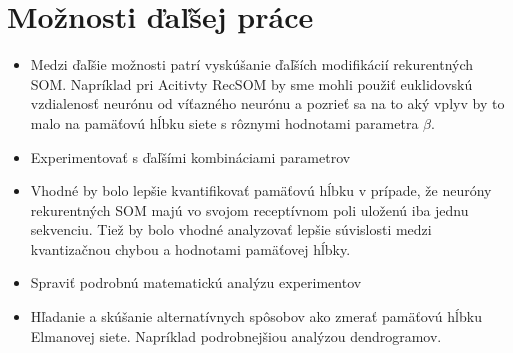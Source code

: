 \section{Možnosti ďaľšej práce}
\begin{itemize}
    \item Medzi ďaľšie možnosti patrí vyskúšanie ďaľších modifikácií rekurentných SOM. Napríklad pri Acitivty RecSOM 
    by sme mohli použiť euklidovskú vzdialenosť neurónu od víťazného neurónu a pozrieť sa na to aký vplyv by to malo 
    na pamäťovú hĺbku siete s rôznymi hodnotami parametra $\beta$.
    \item Experimentovať s ďaľšími kombináciami parametrov
    \item Vhodné by bolo lepšie kvantifikovať pamäťovú hĺbku v prípade, že neuróny rekurentných SOM majú vo svojom
    receptívnom poli uloženú iba jednu sekvenciu. Tiež by bolo vhodné analyzovať lepšie súvislosti medzi kvantizačnou chybou a hodnotami pamäťovej hĺbky.
    \item Spraviť podrobnú matematickú analýzu experimentov
    \item Hľadanie a skúšanie alternatívnych spôsobov ako zmerať pamäťovú hĺbku Elmanovej siete. Napríklad podrobnejšiou
    analýzou dendrogramov.
\end{itemize}





